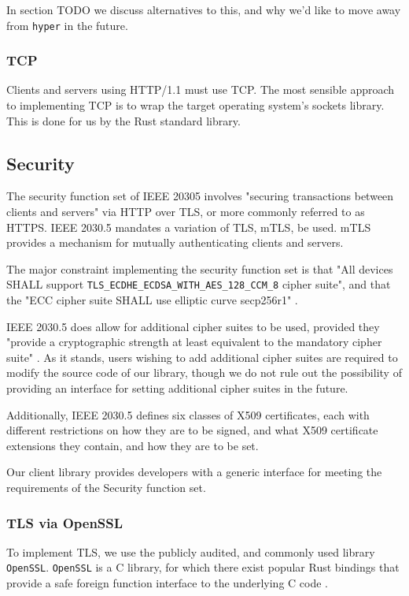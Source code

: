 In section TODO we discuss alternatives to this, and why we'd like to move away from \texttt{hyper} in the future.

\subsubsection{TCP}
Clients and servers using HTTP/1.1 must use TCP. The most sensible approach to implementing TCP is to wrap the target operating system's sockets library. This is done for us by the Rust standard library.

\subsection{Security}
The security function set of IEEE 20305 involves "securing transactions between clients and servers" via HTTP over TLS, or more commonly referred to as HTTPS. IEEE 2030.5 mandates a variation of TLS, mTLS, be used. mTLS provides a mechanism for mutually authenticating clients and servers. 

The major constraint implementing the security function set is that "All devices SHALL support \texttt{TLS\_ECDHE\_ECDSA\_WITH\_AES\_128\_CCM\_8} cipher suite", and that the "ECC cipher suite SHALL use elliptic curve secp256r1" \cite{IEEE2030.5}.

IEEE 2030.5 does allow for additional cipher suites to be used, provided they "provide a cryptographic strength at least equivalent to the mandatory cipher suite" \cite{IEEE2030.5}.  As it stands, users wishing to add additional cipher suites are required to modify the source code of our library, though we do not rule out the possibility of providing an interface for setting additional cipher suites in the future.

Additionally, IEEE 2030.5 defines six classes of X509 certificates, each with different restrictions on how they are to be signed, and what  X509 certificate extensions they contain, and how they are to be set.

Our client library provides developers with a generic interface for meeting the requirements of the Security function set.

\subsubsection{TLS via OpenSSL}
To implement TLS, we use the publicly audited, and commonly used library \texttt{OpenSSL}. \texttt{OpenSSL} is a C library, for which there exist popular Rust bindings that provide a safe foreign function interface to the underlying C code \cite{openssl}. 

